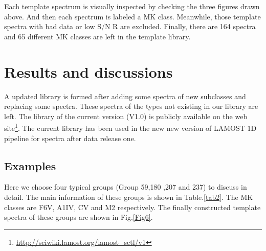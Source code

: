 \documentclass[referee]{raa}            %
\begin{document}
Each template spectrum is visually inspected by checking the three figures drawn above.
And then each spectrum is labeled a MK class.
Meanwhile, those template spectra with bad data or low S/N R are excluded.
Finally,  there are 164 spectra and 65 different MK classes are left in the template library.


\section{Results and  discussions}
\label{sect:Results}
A updated library is formed after adding some spectra of new subclasses and replacing some spectra.
These spectra of the types not existing in our library are left.
The library of the current version (V1.0) is publicly available on the web site\footnote{\url{http://sciwiki.lamost.org/lamost_sctl/v1}}.
The current library has been used in the new new version of LAMOST 1D pipeline for spectra after data release one.
\subsection{Examples}
\label{sect:Examples}
Here we choose four typical groups  (Group 59,180 ,207 and 237)  to  discuss in detail.
The main information of these groups is shown in Table.\ref{tab2}.
The MK classes are F6V, A1IV, CV and M2 respectively.
The finally constructed template spectra of these groups are  shown in Fig.\ref{Fig6}.
\end{document}
